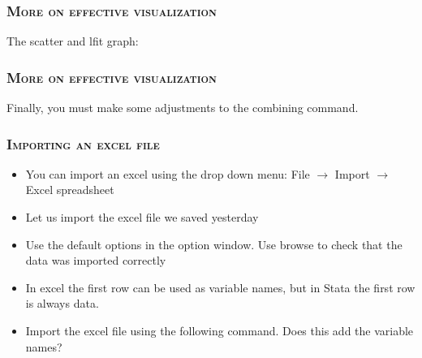 \documentclass[10pt]{beamer}
\begin{document}
	\begin{frame}
	\frametitle{\textsc{More on effective visualization}}
	The scatter and lfit graph:
\begin{stlog}\end{stlog}
	\end{frame}	

	\begin{frame}
	\frametitle{\textsc{More on effective visualization}}
	Finally, you must make some adjustments to the combining command.
\begin{stlog}\end{stlog}
	\end{frame}	
	
	
	\begin{frame}
		\frametitle{\textsc{Importing an excel file}}
		\begin{itemize}
		\item You can import an excel using the drop down menu:
		File $\rightarrow$ Import $\rightarrow$ Excel spreadsheet
		\item Let us import the excel file we saved yesterday
		\item Use the default options in the option window. 
		Use browse to check that the data was imported correctly
		\item In excel the first row can be used as variable names,
		but in Stata the first row is always data. 

		\item Import the excel file using the following command. Does this add the variable names?
		
		\end{itemize}
		
\begin{stlog}\end{stlog}
		
		
		
	\end{frame}
	
\end{document}
